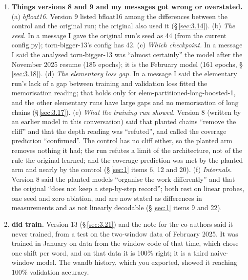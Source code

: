 \documentclass[paper=a4,fontsize=11pt,DIV=11,parskip=half,headings=small,numbers=noendperiod]{scrartcl}
\DeclareRobustCommand{\lead}[1]{\textsf{\bfseries\color{accent}#1}}
\DeclareRobustCommand{\code}[1]{{\fontseries{m}\ttfamily #1}}
\begin{document}
\begin{enumerate}
  of them each statement is about. You pointed this out.
\item \lead{Things versions 8 and 9 and my messages got wrong or overstated.} (a) \emph{bfloat16.} Version 9
  listed bfloat16 among the differences between the control and the original run; the original also used it
  (\S\,\ref{sec:3.14}). (b) \emph{The seed.} In a message I gave the original run’s seed as 44 (from the current
  \code{config.\allowbreak{}py}); \code{torn-\allowbreak{}bigger-\allowbreak{}13}’s config has 42. (c)
  \emph{Which checkpoint.} In a message I said the analysed \code{torn-\allowbreak{}bigger-\allowbreak{}13} was
  “almost certainly” the model after the November 2025 resume (185 epochs); it is the February model (161
  epochs, \S\,\ref{sec:3.18}). (d) \emph{The elementary loss gap.} In a message I said the elementary run’s lack
  of a gap between training and validation loss fitted the memorisation reading; that holds only for
  \code{elem-\allowbreak{}partitioned-\allowbreak{}long-\allowbreak{}boosted-\allowbreak{}1}, and the other
  elementary runs have large gaps and no memorisation of long chains (\S\,\ref{sec:3.17}). (e) \emph{What the
  training run showed.} Version 8 (written by an earlier model in this conversation) said that planted chains
  “remove the cliff” and that the depth reading was “refuted”, and called the coverage prediction “confirmed”.
  The control has no cliff either, so the planted arm removes nothing it had; the run refutes a limit of the
  architecture, not of the rule the original learned; and the coverage prediction was met by the planted arm and
  nearly by the control (\S\,\ref{sec:1} items 6, 12 and 20). (f) \emph{Internals.} Version 8 said the planted
  models “organise the work differently” and that the original “does not keep a step-by-step record”; both rest
  on linear probes, one seed and zero ablation, and are now stated as differences in measurements and as not
  linearly decodable (\S\,\ref{sec:1} items 9 and 22).
\item \lead{\code{elem-\allowbreak{}wacky-\allowbreak{}1} did train.} Version 13 (\S\,\ref{sec:3.21}) and the
  note for the co-authors said it never trained, from a test on the two-window data of February 2025. It was
  trained in January on data from the window code of that time, which chose one shift per word, and on that data
  it is 100\% right; it is a third naive-window model. The wandb history, which you exported, showed it reaching
  100\% validation accuracy.
\end{enumerate}
\end{document}
